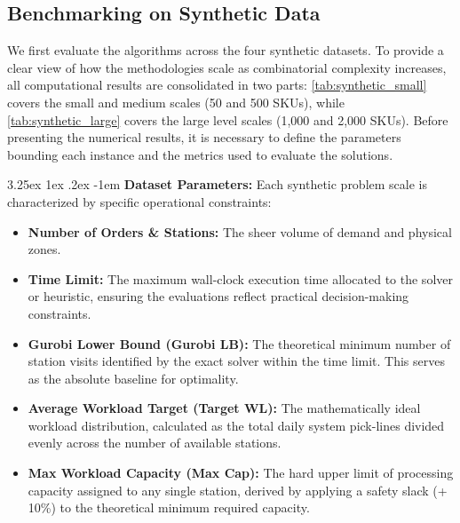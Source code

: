 \documentclass[preprint,review,11pt,authoryear]{elsarticle}
\makeatletter
\renewcommand\paragraph{\@startsection{paragraph}{4}{\z@}
  {3.25ex \@plus1ex \@minus.2ex}
  {-1em}
  {\normalfont\normalsize\itshape}}
\makeatother
\begin{document}
\subsection{Benchmarking on Synthetic Data}

We first evaluate the algorithms across the four synthetic datasets. To provide a clear view of how the methodologies scale as combinatorial complexity increases, all computational results are consolidated in two parts: \cref{tab:synthetic_small} covers the small and medium scales (50 and 500 SKUs), while \cref{tab:synthetic_large} covers the large level scales (1,000 and 2,000 SKUs). Before presenting the numerical results, it is necessary to define the parameters bounding each instance and the metrics used to evaluate the solutions.

\paragraph{\textbf{Dataset Parameters:}}
Each synthetic problem scale is characterized by specific operational constraints:
\begin{itemize}
    \item \textbf{Number of Orders \& Stations:} The sheer volume of demand and physical zones.
    \item \textbf{Time Limit:} The maximum wall-clock execution time allocated to the solver or heuristic, ensuring the evaluations reflect practical decision-making constraints.
    \item \textbf{Gurobi Lower Bound (Gurobi LB):} The theoretical minimum number of station visits identified by the exact solver within the time limit. This serves as the absolute baseline for optimality.
    \item \textbf{Average Workload Target (Target WL):} The mathematically ideal workload distribution, calculated as the total daily system pick-lines divided evenly across the number of available stations.
    \item \textbf{Max Workload Capacity (Max Cap):} The hard upper limit of processing capacity assigned to any single station, derived by applying a safety slack (+ 10\%) to the theoretical minimum required capacity.
\end{itemize}
\end{document}
